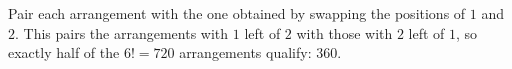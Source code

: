 Pair each arrangement with the one obtained by swapping the positions of $1$ and $2$. This pairs the arrangements with $1$ left of $2$ with those with $2$ left of $1$, so exactly half of the $6!=720$ arrangements qualify: $\boxed{360}$.
